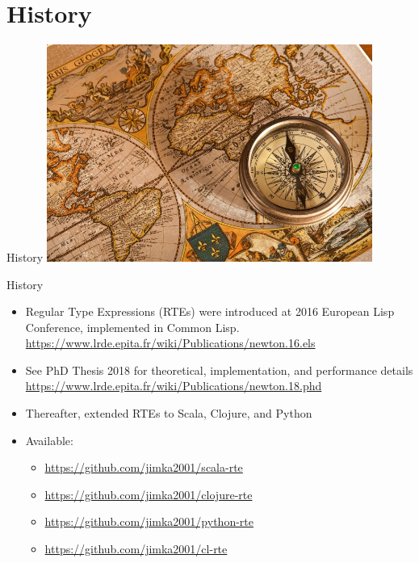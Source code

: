 \section{History}
{  %
\begin{frame}{History}
  \centering
  \includegraphics[width=0.8\textwidth]{history.jpg}
\end{frame}
}
\begin{frame}{History}
  \begin{itemize}
  \item Regular Type Expressions (RTEs) were introduced at 2016 European Lisp Conference, implemented in Common Lisp.
    \url{https://www.lrde.epita.fr/wiki/Publications/newton.16.els}
  \item See PhD Thesis 2018 for theoretical, implementation, and performance details
    \url{https://www.lrde.epita.fr/wiki/Publications/newton.18.phd}
  \item Thereafter, extended RTEs to Scala, Clojure, and Python
  \item Available:
    \begin{itemize}
    \item \url{https://github.com/jimka2001/scala-rte}
    \item \url{https://github.com/jimka2001/clojure-rte}
    \item \url{https://github.com/jimka2001/python-rte}
    \item \url{https://github.com/jimka2001/cl-rte}
    \end{itemize}
  \end{itemize}
\end{frame}



